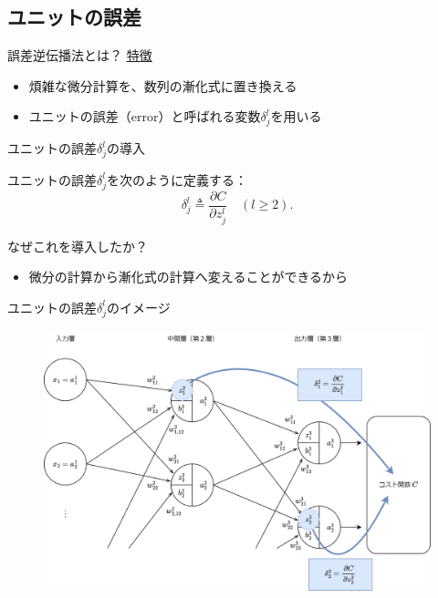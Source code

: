 \documentclass[dvipdfmx,aspectratio=169]{beamer}
\begin{document}
	\subsection{ユニットの誤差}
	\begin{frame}{誤差逆伝播法とは？}
		\underline{特徴}
		\begin{itemize}
			\item 煩雑な微分計算を、\alert{数列の漸化式}に置き換える
			\item \alert{ユニットの誤差}（error）と呼ばれる変数$ \delta^l_j $を用いる
		\end{itemize}
	\end{frame}
	\begin{frame}{ユニットの誤差$ \delta^l_j $の導入}
		\begin{screen}
			\alert{ユニットの誤差}$ \delta^l_j $を次のように定義する：
			\begin{equation}\label{eq:unit-error}
				\delta^l_j \triangleq \dfrac{\partial C}{\partial z^l_j}\quad (l \geq 2).
			\end{equation}
		\end{screen}
		なぜこれを導入したか？
		\begin{itemize}
			\item 微分の計算から漸化式の計算へ変えることができるから
		\end{itemize}		
	\end{frame}
	\begin{frame}{ユニットの誤差$ \delta^l_j $のイメージ}
		\begin{figure}
			\centering
			\includegraphics[width=0.7\linewidth]{img/image-of-unit-error}
		\end{figure}
	\end{frame}
\end{document}
